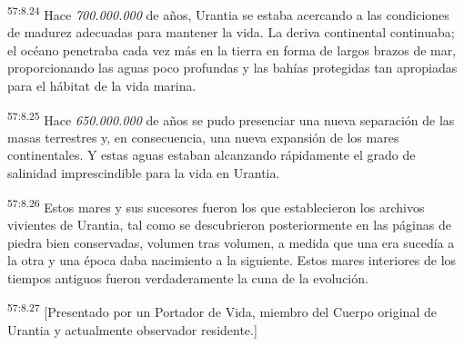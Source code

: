 \par
\textsuperscript{57:8.24} Hace \textit{700.000.000} de años, Urantia se estaba acercando a las condiciones de madurez adecuadas para mantener la vida. La deriva continental continuaba; el océano penetraba cada vez más en la tierra en forma de largos brazos de mar, proporcionando las aguas poco profundas y las bahías protegidas tan apropiadas para el hábitat de la vida marina.

\par
\textsuperscript{57:8.25} Hace \textit{650.000.000} de años se pudo presenciar una nueva separación de las masas terrestres y, en consecuencia, una nueva expansión de los mares continentales. Y estas aguas estaban alcanzando rápidamente el grado de salinidad imprescindible para la vida en Urantia.

\par
\textsuperscript{57:8.26} Estos mares y sus sucesores fueron los que establecieron los archivos vivientes de Urantia, tal como se descubrieron posteriormente en las páginas de piedra bien conservadas, volumen tras volumen, a medida que una era sucedía a la otra y una época daba nacimiento a la siguiente. Estos mares interiores de los tiempos antiguos fueron verdaderamente la cuna de la evolución.

\par
\textsuperscript{57:8.27} [Presentado por un Portador de Vida, miembro del Cuerpo original de Urantia y actualmente observador residente.]